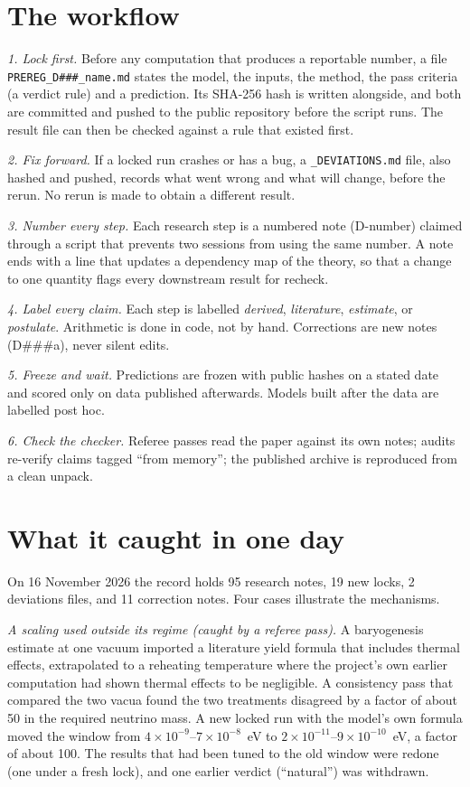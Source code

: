 \documentclass[aps,prd,twocolumn,superscriptaddress,nofootinbib,showkeys]{revtex4-2}
\begin{document}
\section{The workflow}
\emph{1. Lock first.} Before any computation that produces a reportable number, a file \texttt{PREREG\_D\#\#\#\_name.md} states the model, the inputs, the method, the pass criteria (a verdict rule) and a prediction. Its SHA-256 hash is written alongside, and both are committed and pushed to the public repository before the script runs. The result file can then be checked against a rule that existed first.

\emph{2. Fix forward.} If a locked run crashes or has a bug, a \texttt{\_DEVIATIONS.md} file, also hashed and pushed, records what went wrong and what will change, before the rerun. No rerun is made to obtain a different result.

\emph{3. Number every step.} Each research step is a numbered note (D-number) claimed through a script that prevents two sessions from using the same number. A note ends with a line that updates a dependency map of the theory, so that a change to one quantity flags every downstream result for recheck.

\emph{4. Label every claim.} Each step is labelled \emph{derived}, \emph{literature}, \emph{estimate}, or \emph{postulate}. Arithmetic is done in code, not by hand. Corrections are new notes (D\#\#\#a), never silent edits.

\emph{5. Freeze and wait.} Predictions are frozen with public hashes on a stated date and scored only on data published afterwards. Models built after the data are labelled post hoc.

\emph{6. Check the checker.} Referee passes read the paper against its own notes; audits re-verify claims tagged ``from memory''; the published archive is reproduced from a clean unpack.

\section{What it caught in one day}
On 16 November 2026 the record holds 95 research notes, 19 new locks, 2 deviations files, and 11 correction notes. Four cases illustrate the mechanisms.

\emph{A scaling used outside its regime (caught by a referee pass).} A baryogenesis estimate at one vacuum imported a literature yield formula that includes thermal effects, extrapolated to a reheating temperature where the project's own earlier computation had shown thermal effects to be negligible. A consistency pass that compared the two vacua found the two treatments disagreed by a factor of about 50 in the required neutrino mass. A new locked run with the model's own formula moved the window from $4\times10^{-9}$--$7\times10^{-8}$~eV to $2\times10^{-11}$--$9\times10^{-10}$~eV, a factor of about 100. The results that had been tuned to the old window were redone (one under a fresh lock), and one earlier verdict (``natural'') was withdrawn.
\end{document}
